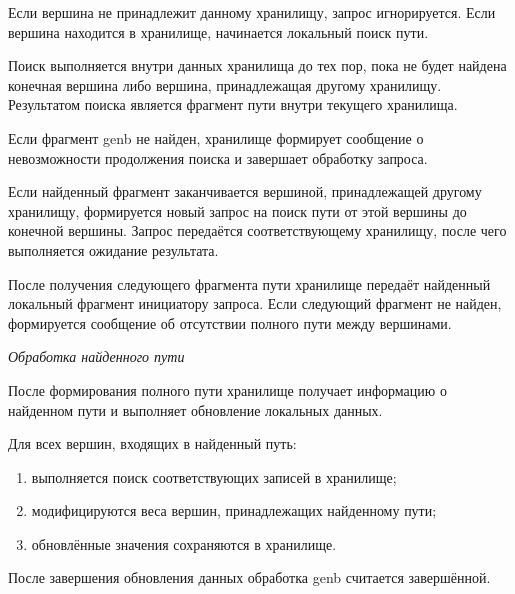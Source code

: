 Если вершина не принадлежит данному хранилищу, запрос игнорируется. Если вершина находится в хранилище, начинается локальный поиск пути.

Поиск выполняется внутри данных хранилища до тех пор, пока не будет найдена конечная вершина либо вершина, принадлежащая другому хранилищу. Результатом поиска является фрагмент пути внутри текущего хранилища.

Если фрагмент genb не найден, хранилище формирует сообщение о невозможности продолжения поиска и завершает обработку запроса.

Если найденный фрагмент заканчивается вершиной, принадлежащей другому хранилищу, формируется новый запрос на поиск пути от этой вершины до конечной вершины. Запрос передаётся соответствующему хранилищу, после чего выполняется ожидание результата.

После получения следующего фрагмента пути хранилище передаёт найденный локальный фрагмент инициатору запроса. Если следующий фрагмент не найден, формируется сообщение об отсутствии полного пути между вершинами.

\textit{Обработка найденного пути}

После формирования полного пути хранилище получает информацию о найденном пути и выполняет обновление локальных данных.

Для всех вершин, входящих в найденный путь:
\begin{enumerate}
    \item выполняется поиск соответствующих записей в хранилище;
    \item модифицируются веса вершин, принадлежащих найденному пути;
    \item обновлённые значения сохраняются в хранилище.
\end{enumerate}

После завершения обновления данных обработка genb считается завершённой.
